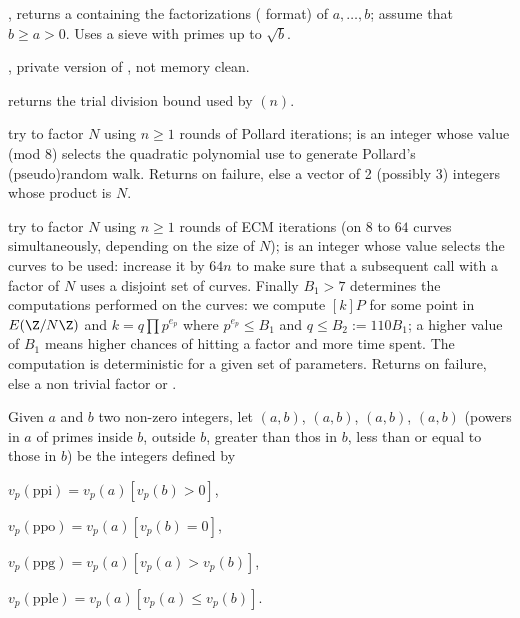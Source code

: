 , returns a  containing
the factorizations ( format) of $a,\dots, b$; assume that $b
\geq a > 0$. Uses a sieve with primes up to $\sqrt{b}$.

, private version of
, not memory clean.

 returns the trial division bound used by
$(n)$.

 try to factor
 $N$ using $n\geq 1$ rounds of Pollard iterations;  is an
integer whose value (mod $8$) selects the quadratic polynomial use to
generate Pollard's (pseudo)random walk. Returns  on failure, else a
vector of 2 (possibly 3) integers whose product is $N$.

 try to
factor  $N$ using $n\geq 1$ rounds of ECM iterations (on $8$ to $64$
curves simultaneously, depending on the size of $N$);  is an
integer whose value selects the curves to be used: increase it by $64n$ to
make sure that a subsequent call with a factor of $N$ uses a disjoint set of
curves.
Finally $B_1 > 7$ determines the computations performed on the
curves: we compute $[k]P$ for some point in $E(\Z/N\Z)$ and $k = q \prod
p^{e_p}$ where $p^{e_p} \leq B_1$ and $q \leq B_2 := 110 B_1$; a higher value
of $B_1$ means higher chances of hitting a factor and more time spent.
The computation is deterministic for a given set of parameters. Returns
 on failure, else a non trivial factor or .


Given $a$ and $b$ two non-zero integers, let $(a,b)$, $(a,b)$,
$(a,b)$, $(a,b)$ (powers in $a$ of primes inside $b$,
outside $b$, greater than thos in $b$, less than or equal to those in $b$) be
the integers defined by

\item $v_p(\text{ppi}) = v_p(a) [v_p(b) > 0]$,

\item $v_p(\text{ppo}) = v_p(a) [v_p(b) = 0]$,

\item $v_p(\text{ppg}) = v_p(a) [v_p(a) > v_p(b)]$,

\item $v_p(\text{pple}) = v_p(a) [v_p(a) \leq v_p(b)]$.

